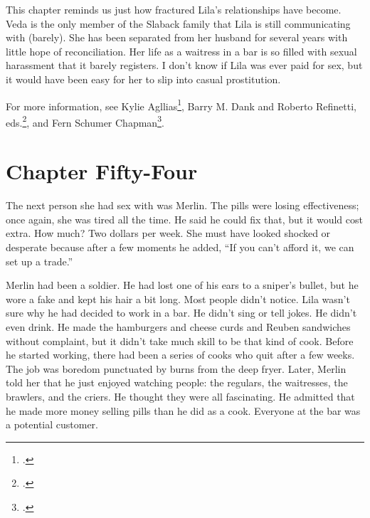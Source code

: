 \documentclass[
  letterpaper,
]{book}
\begin{document}
This chapter reminds us just how fractured Lila's relationships have
become. Veda is the only member of the Slaback family that Lila is still
communicating with (barely). She has been separated from her husband for
several years with little hope of reconciliation. Her life as a waitress
in a bar is so filled with sexual harassment that it barely registers. I
don't know if Lila was ever paid for sex, but it would have been easy
for her to slip into casual prostitution.

For more information, see Kylie Agllias\footnote{.}, Barry M. Dank and Roberto Refinetti, eds.\footnote{.}, and Fern
Schumer Chapman\footnote{.}.


\chapter{Chapter Fifty-Four}\label{chapter-fifty-four}

The next person she had sex with was Merlin. The pills were losing
effectiveness; once again, she was tired all the time. He said he could
fix that, but it would cost extra. How much? Two dollars per week. She
must have looked shocked or desperate because after a few moments he
added, ``If you can't afford it, we can set up a trade.''

Merlin had been a soldier. He had lost one of his ears to a sniper's
bullet, but he wore a fake and kept his hair a bit long. Most people
didn't notice. Lila wasn't sure why he had decided to work in a bar. He
didn't sing or tell jokes. He didn't even drink. He made the hamburgers
and cheese curds and Reuben sandwiches without complaint, but it didn't
take much skill to be that kind of cook. Before he started working,
there had been a series of cooks who quit after a few weeks. The job was
boredom punctuated by burns from the deep fryer. Later, Merlin told her
that he just enjoyed watching people: the regulars, the waitresses, the
brawlers, and the criers. He thought they were all fascinating. He
admitted that he made more money selling pills than he did as a cook.
Everyone at the bar was a potential customer.
\end{document}
